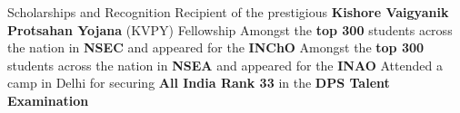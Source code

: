\begin{rubric}{Scholarships and Recognition}
	\entry*[2017] Recipient of the prestigious \textbf{Kishore Vaigyanik Protsahan Yojana} (KVPY) Fellowship
	\entry*[2019] Amongst the {\bf top 300} students across the nation in {\bf NSEC} and appeared for the {\bf INChO}
	\entry*[2019\phantom{}] Amongst the {\bf top 300} students across the nation in {\bf NSEA} and appeared for the {\bf INAO}
	\entry*[2015] Attended a camp in Delhi for securing \textbf{All India Rank 33} in the \textbf{DPS Talent Examination}
\end{rubric}